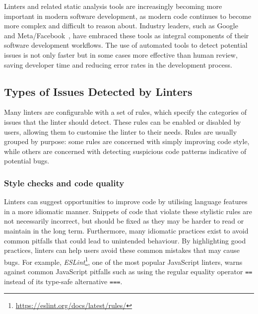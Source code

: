 \documentclass[../../main.tex]{subfiles}
\begin{document}
Linters and related static analysis tools are increasingly becoming more important in modern software development, as modern code continues to become more complex and difficult to reason about.
Industry leaders, such as Google~\cite{sadowski_analysis-google_2018} and Meta/Facebook~\cite{calcagno_moving-facebook_2015}, have embraced these tools as integral components of their software development workflows.
The use of automated tools to detect potential issues is not only faster but in some cases more effective than human review, saving developer time and reducing error rates in the development process.

\subsection{Types of Issues Detected by Linters}

Many linters are configurable with a set of rules, which specify the categories of issues that the linter should detect.
These rules can be enabled or disabled by users, allowing them to customise the linter to their needs.
Rules are usually grouped by purpose: some rules are concerned with simply improving code style, while others are concerned with detecting suspicious code patterns indicative of potential bugs.

\subsubsection{Style checks and code quality}

Linters can suggest opportunities to improve code by utilising language features in a more idiomatic manner.
Snippets of code that violate these stylistic rules are not necessarily incorrect, but should be fixed as they may be harder to read or maintain in the long term.
Furthermore, many idiomatic practices exist to avoid common pitfalls that could lead to unintended behaviour.
By highlighting good practices, linters can help users avoid these common mistakes that may cause bugs.
For example, \emph{ESLint}\footnote{\url{https://eslint.org/docs/latest/rules/}}, one of the most popular JavaScript linters, warns against common JavaScript pitfalls such as using the regular equality operator \texttt{==} instead of its type-safe alternative \texttt{===}.
\end{document}
